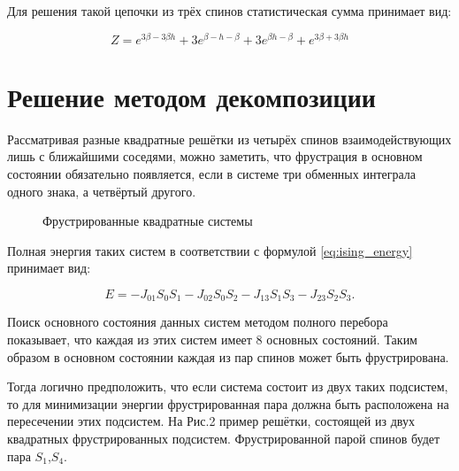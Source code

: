 \documentclass[utf8, babel, sor, jor, amsmath,amssymb, reprint]{elsarticle} %
\begin{document}
Для решения такой цепочки из трёх спинов статистическая сумма
принимает вид:

\begin{equation}
	Z = e^{3\beta - 3\beta h} + 3e^{\beta - h - \beta} + 3e^{\beta h - \beta} + e^{3\beta + 3\beta h}
	\label{eq:stat_3}
\end{equation}

\section{Решение методом декомпозиции}

Рассматривая разные квадратные решётки из четырёх спинов взаимодействующих лишь с ближайшими соседями, можно заметить, что фрустрация в основном состоянии обязательно появляется, если в системе три обменных интеграла одного знака, а четвёртый другого.

\begin{figure}[h]
	\centering
	\caption{Фрустрированные квадратные системы}
	\label{fig:label}
\end{figure}

Полная энергия таких систем в соответствии с формулой \eqref{eq:ising_energy} принимает вид:

\begin{equation}
	E = -J_{01} S_0 S_1-J_{02} S_0 S_2-J_{13} S_1 S_3-J_{23} S_2 S_3.
	\label{eq:ising_energy_2x2}
\end{equation}

Поиск основного состояния данных систем методом полного перебора показывает, что каждая из этих систем имеет 8 основных состояний. Таким образом в основном состоянии каждая из пар спинов может быть фрустрирована.

Тогда логично предположить, что если система состоит из двух таких подсистем, то для минимизации энергии фрустрированная пара должна быть расположена на пересечении этих подсистем.
На Рис.2 пример решётки, состоящей из двух квадратных фрустрированных подсистем. Фрустрированной парой спинов будет пара $S_1$,$S_4$.
\end{document}
